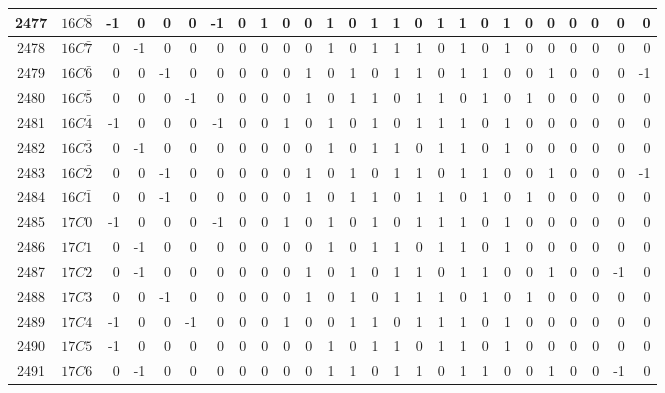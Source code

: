 \documentclass[12 pt]{article}%
\begin{document}
\begin{tiny}
\begin{centering}
\begin{longtable}{|c|c||rrrrrrrrrrrrrrrrrrrrrrrr|}
      \hline
      2477 & $16C\bar8$ & -1 & 0 & 0 & 0 & -1 & 0 & 1 & 0 & 0 & 1 & 0 & 1 & 1 & 0 & 1 & 1 & 0 & 1 & 0 & 0 & 0 & 0 & 0 & 0 \\
      \hline
      2478 & $16C\bar7$ & 0 & -1 & 0 & 0 & 0 & 0 & 0 & 0 & 0 & 1 & 0 & 1 & 1 & 1 & 0 & 1 & 0 & 1 & 0 & 0 & 0 & 0 & 0 & 0 \\
      \hline
      2479 & $16C\bar6$ & 0 & 0 & -1 & 0 & 0 & 0 & 0 & 0 & 1 & 0 & 1 & 0 & 1 & 1 & 0 & 1 & 1 & 0 & 0 & 1 & 0 & 0 & 0 & -1 \\
      \hline
      2480 & $16C\bar5$ & 0 & 0 & 0 & -1 & 0 & 0 & 0 & 0 & 1 & 0 & 1 & 1 & 0 & 1 & 1 & 0 & 1 & 0 & 1 & 0 & 0 & 0 & 0 & 0 \\
      \hline
      2481 & $16C\bar4$ & -1 & 0 & 0 & 0 & -1 & 0 & 0 & 1 & 0 & 1 & 0 & 1 & 0 & 1 & 1 & 1 & 0 & 1 & 0 & 0 & 0 & 0 & 0 & 0 \\
      \hline
      2482 & $16C\bar3$ & 0 & -1 & 0 & 0 & 0 & 0 & 0 & 0 & 0 & 1 & 0 & 1 & 1 & 0 & 1 & 1 & 0 & 1 & 0 & 0 & 0 & 0 & 0 & 0 \\
      \hline
      2483 & $16C\bar2$ & 0 & 0 & -1 & 0 & 0 & 0 & 0 & 0 & 1 & 0 & 1 & 0 & 1 & 1 & 0 & 1 & 1 & 0 & 0 & 1 & 0 & 0 & 0 & -1 \\
      \hline
      2484 & $16C\bar1$ & 0 & 0 & -1 & 0 & 0 & 0 & 0 & 0 & 1 & 0 & 1 & 1 & 0 & 1 & 1 & 0 & 1 & 0 & 1 & 0 & 0 & 0 & 0 & 0 \\
      \hline
      2485 & $17C0$ & -1 & 0 & 0 & 0 & -1 & 0 & 0 & 1 & 0 & 1 & 0 & 1 & 0 & 1 & 1 & 1 & 0 & 1 & 0 & 0 & 0 & 0 & 0 & 0 \\
      \hline
      2486 & $17C1$ & 0 & -1 & 0 & 0 & 0 & 0 & 0 & 0 & 0 & 1 & 0 & 1 & 1 & 0 & 1 & 1 & 0 & 1 & 0 & 0 & 0 & 0 & 0 & 0 \\
      \hline
      2487 & $17C2$ & 0 & -1 & 0 & 0 & 0 & 0 & 0 & 0 & 1 & 0 & 1 & 0 & 1 & 1 & 0 & 1 & 1 & 0 & 0 & 1 & 0 & 0 & -1 & 0 \\
      \hline
      2488 & $17C3$ & 0 & 0 & -1 & 0 & 0 & 0 & 0 & 0 & 1 & 0 & 1 & 0 & 1 & 1 & 1 & 0 & 1 & 0 & 1 & 0 & 0 & 0 & 0 & 0 \\
      \hline
      2489 & $17C4$ & -1 & 0 & 0 & -1 & 0 & 0 & 0 & 1 & 0 & 0 & 1 & 1 & 0 & 1 & 1 & 1 & 0 & 1 & 0 & 0 & 0 & 0 & 0 & 0 \\
      \hline
      2490 & $17C5$ & -1 & 0 & 0 & 0 & 0 & 0 & 0 & 0 & 0 & 1 & 0 & 1 & 1 & 0 & 1 & 1 & 0 & 1 & 0 & 0 & 0 & 0 & 0 & 0 \\
      \hline
      2491 & $17C6$ & 0 & -1 & 0 & 0 & 0 & 0 & 0 & 0 & 0 & 1 & 1 & 0 & 1 & 1 & 0 & 1 & 1 & 0 & 0 & 1 & 0 & 0 & -1 & 0 \\

\end{longtable}
\end{centering}
\end{tiny}
\end{document}
